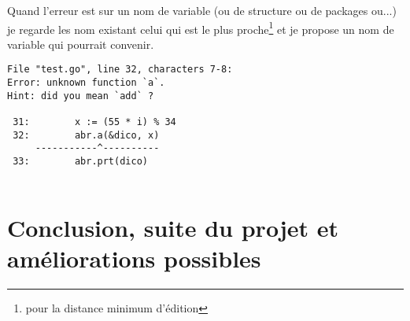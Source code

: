 \documentclass{article}
\begin{document}
Quand l'erreur est sur un nom de variable (ou de structure ou de packages ou...) je regarde les nom existant celui qui est le plus proche\footnote{pour la distance minimum d'édition} et je propose un nom de variable qui pourrait convenir.

\begin{verbatim}
File "test.go", line 32, characters 7-8:
Error: unknown function `a`.
Hint: did you mean `add` ?

 31:        x := (55 * i) % 34
 32:        abr.a(&dico, x)
     -----------^----------
 33:        abr.prt(dico)


\end{verbatim}

\section{Conclusion, suite du projet et améliorations possibles}
\end{document}
